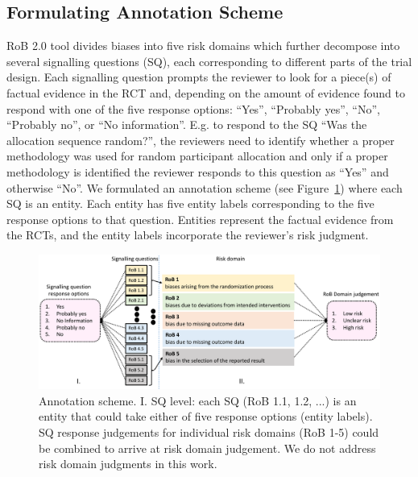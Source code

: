 \documentclass{IOS-Book-Article}
\begin{document}
\subsection{Formulating Annotation Scheme}
%
RoB 2.0 tool divides biases into five risk domains which further decompose into several signalling questions (SQ), each corresponding to different parts of the trial design.
Each signalling question prompts the reviewer to look for a piece(s) of factual evidence in the RCT and, depending on the amount of evidence found to respond with one of the five response options: ``Yes'', ``Probably yes'', ``No'', ``Probably no'', or ``No information''.
E.g. to respond to the SQ ``Was the allocation sequence random?'', the reviewers need to identify whether a proper methodology was used for random participant allocation and only if a proper methodology is identified the reviewer responds to this question as ``Yes'' and otherwise ``No''.
We formulated an annotation scheme (see Figure~\ref{fig:ann_scheme}) where each SQ is an entity.
Each entity has five entity labels corresponding to the five response options to that question.
Entities represent the factual evidence from the RCTs, and the entity labels incorporate the reviewer's risk judgment.
%
\begin{figure}[!htbp]
    \centering
    \includegraphics[width=\textwidth]{Figures/annotation_scheme.pdf}
    \caption{Annotation scheme. I. SQ level: each SQ (RoB 1.1, 1.2, ...) is an entity that could take either of five response options (entity labels). SQ response judgements for individual risk domains (RoB 1-5) could be combined to arrive at risk domain judgement. We do not address risk domain judgments in this work.}
    \label{fig:ann_scheme}
\end{figure}
%
%
%
\end{document}

